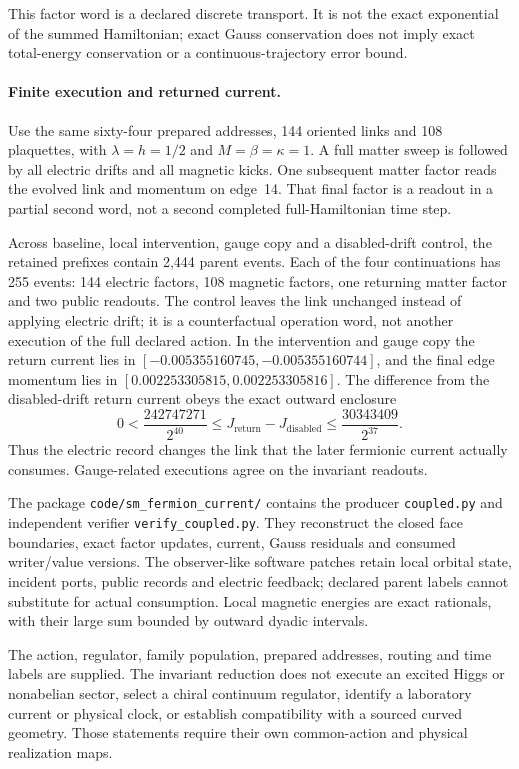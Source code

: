 This factor word is a declared discrete transport. It is not the exact
exponential of the summed Hamiltonian; exact Gauss conservation does not
imply exact total-energy conservation or a continuous-trajectory error bound.

\paragraph{Finite execution and returned current.}
Use the same sixty-four prepared addresses, 144 oriented links and 108
plaquettes, with $\lambda=h=1/2$ and $M=\beta=\kappa=1$. A full matter
sweep is followed by all electric drifts and all magnetic kicks. One
subsequent matter factor reads the evolved link and momentum on edge~14.
That final factor is a readout in a partial second word, not a second
completed full-Hamiltonian time step.

Across baseline, local intervention, gauge copy and a disabled-drift
control, the retained prefixes contain 2,444 parent events.
Each of the four continuations has 255 events: 144 electric factors, 108
magnetic factors, one returning matter factor and two public readouts.
The control leaves the link unchanged instead of applying electric drift;
it is a counterfactual operation word, not another execution of the full
declared action. In the intervention and gauge copy the return current lies
in $[-0.005355160745,-0.005355160744]$, and the final edge momentum lies in
$[0.002253305815,0.002253305816]$. The difference from the disabled-drift
return current obeys the exact outward enclosure
\[
 0<\frac{242747271}{2^{40}}
 \leq J_{\mathrm{return}}-J_{\mathrm{disabled}}
 \leq\frac{30343409}{2^{37}}.
\]
Thus the electric record changes the link that the later fermionic current
actually consumes. Gauge-related executions agree on the invariant readouts.

The package \texttt{code/sm\_fermion\_current/} contains the producer
\texttt{coupled.py} and independent verifier \texttt{verify\_coupled.py}.
They reconstruct the closed face boundaries, exact factor updates, current,
Gauss residuals and consumed writer/value versions. The observer-like
software patches retain local orbital state, incident ports, public records
and electric feedback; declared parent labels cannot substitute for actual
consumption. Local magnetic energies are exact rationals, with their large
sum bounded by outward dyadic intervals.

The action, regulator, family population, prepared addresses, routing and
time labels are supplied. The invariant reduction does not execute an
excited Higgs or nonabelian sector, select a chiral continuum regulator,
identify a laboratory current or physical clock, or establish compatibility
with a sourced curved geometry. Those statements require their own
common-action and physical realization maps.
